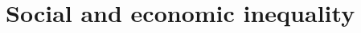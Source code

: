 \documentclass[../summary.tex]{subfiles}
\begin{document}
	
	\section{Social and economic inequality}
	
\end{document}
